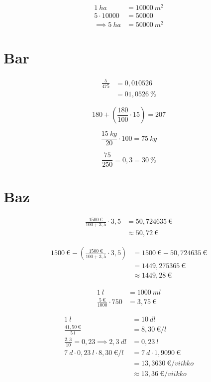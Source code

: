 \begin{align*}
1\ ha &= 10000\ m^2 \\
5 \cdot 10000 &= 50000 \\
\implies 5\ ha &= 50000\ m^2
\end{align*}


\chapter{Bar}

\begin{align*}
\frac{5}{475} &= 0,010526 \\
              &=  01,0526\ \%
\end{align*}



\[
180 + \left ( \frac{180}{100} \cdot 15 \right ) = 207
\]




\[
\frac{15\ kg}{20} \cdot 100 = 75\ kg
\]




\[
\frac{75}{250} = 0,3 = 30\ \%
\]


\chapter{Baz}



\begin{align*}
\frac{1500\ \text{€}}{100 + 3,5} \cdot 3,5 &= 50,724635\ \text{€}  \\
                                 &\approx 50,72\ \text{€}
\end{align*}




\begin{align*}
1500\ \text{€} - \left ( \frac{1500\ \text{€}}{100 + 3,5}  \cdot 3,5 \right ) &= 1500\ \text{€} - 50,724635\ \text{€} \\
&= 1449,275365\ \text{€}\\
&\approx 1449,28\ \text{€}
\end{align*}






\begin{align*}
1\ l &= 1000\ ml \\
\frac{5\ \text{€}}{1000} \cdot 750 &= 3,75\ \text{€}
\end{align*}




\begin{align*}
1\ l &= 10\ dl \\
\frac{41,50\ \text{€}}{5\ l} &= 8,30\ \text{€}/l \\
\frac{2,3}{10} = 0,23 \implies 2,3\ dl &= 0,23\ l \\
7\ d \cdot 0,23\ l \cdot 8,30\ \text{€}/l &= 7\ d \cdot 1,9090\ \text{€} \\
&= 13,3630\ \text{€}/viikko \\
&\approx 13,36\ \text{€}/viikko
\end{align*}


